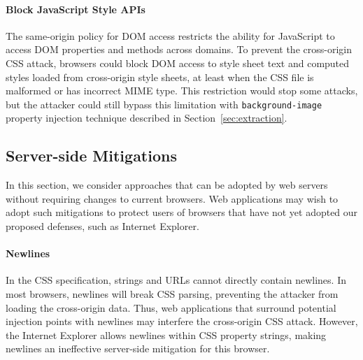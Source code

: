\documentclass{acm_proc_article-sp}
\begin{document}
\paragraph{Block JavaScript Style APIs}
The same-origin policy for DOM access restricts the ability for JavaScript to
access DOM properties and methods across domains. To prevent the cross-origin
CSS attack, browsers could block DOM access to style sheet text and computed
styles loaded from cross-origin style sheets, at least when the CSS file is
malformed or has incorrect MIME type. This restriction would stop some
attacks, but the attacker could still bypass this limitation with
\texttt{background-image} property injection technique described in
Section~\ref{sec:extraction}.


\subsection{Server-side Mitigations}
In this section, we consider approaches that can be adopted by web servers
without requiring changes to current browsers. Web applications may wish to
adopt such mitigations to protect users of browsers that have not yet adopted
our proposed defenses, such as Internet Explorer.

\paragraph{Newlines}
In the CSS specification, strings and URLs cannot directly contain newlines.
In most browsers, newlines will break CSS parsing, preventing the attacker from loading the cross-origin data.
Thus, web applications that surround potential injection points with
newlines may interfere the cross-origin CSS attack.
However, the Internet Explorer allows newlines within CSS
property strings, making newlines an ineffective server-side mitigation for this browser.
\end{document}
